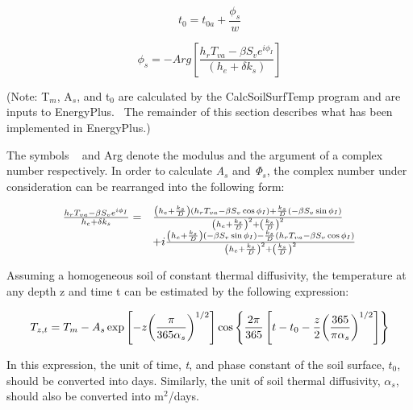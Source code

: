 \begin{equation}
{t_0} = {t_{0a}} + \frac{{{\phi_s}}}{w}
\end{equation}

\begin{equation}
{\phi_s} =  - Arg\left[ {\frac{{{h_r}{T_{va}} - \beta {S_v}{e^{i{\phi_I}}}}}{{\left( {{h_e} + \delta {k_s}} \right)}}} \right]
\end{equation}

(Note: T\(_{m}\), A\(_{s}\), and t\(_{0}\) are calculated by the CalcSoilSurfTemp program and are inputs to EnergyPlus.~ The remainder of this section describes what has been implemented in EnergyPlus.)

The symbols \textbar{}\textbar{}~ \textbar{}\textbar{} and Arg denote the modulus and the argument of a complex number respectively. In order to calculate \emph{A\(_{s}\)} and \emph{Φ\(_{s}\)}, the complex number under consideration can be rearranged into the following form:

\begin{equation}
  \begin{array}{rl}
    \frac{h_r T_{va} - \beta S_v e^{i \phi_I}}{h_e + \delta k_s} 
           =&  \frac{ \PB{h_e + \frac{k_s}{D}} \PB{ h_r T_{va} - \beta S_v \cos \phi_I} + \frac{k_s}{D} \PB{-\beta S_v \sin \phi_I}}{\PB{h_e + \frac{k_s}{D}}^2 + \PB{\frac{k_s}{D}}^2} \\
           &+ i\frac{ \PB{h_e + \frac{k_s}{D}} \PB{-\beta S_v \sin \phi_I} - \frac{k_s}{D} \PB{h_r T_{va} - \beta S_v \cos \phi_I}}{\PB{h_e + \frac{k_s}{D}}^2 + \PB{\frac{k_s}{D}}^2}
  \end{array}
\end{equation}

Assuming a homogeneous soil of constant thermal diffusivity, the temperature at any depth z and time t can be estimated by the following expression:

\begin{equation}
{T_{z,t}} = {T_m} - {A_s}\exp \left[ { - z{{\left( {\frac{\pi }{{{\rm{365}}{\alpha_s}}}} \right)}^{1/2}}} \right]\cos \left\{ {\frac{{2\pi }}{{{\rm{365}}}}\left[ {t - {t_0} - \frac{z}{2}{{\left( {\frac{{{\rm{365}}}}{{\pi {\alpha_s}}}} \right)}^{1/2}}} \right]} \right\}
\end{equation}

In this expression, the unit of time, \emph{t}, and phase constant of the soil surface, \(t_{0}\), should be converted into days. Similarly, the unit of soil thermal diffusivity, \({\alpha_{s}}\), should also be converted into m\(^{2}\)/days.

